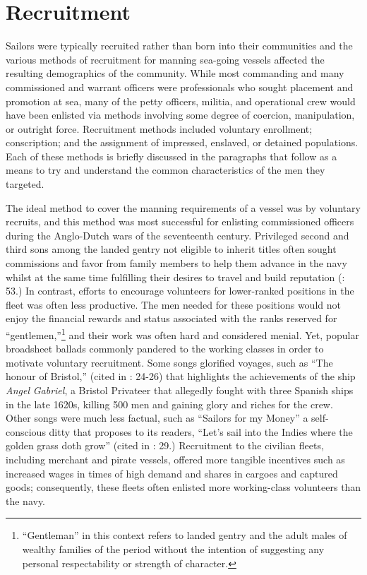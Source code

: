 \section{\textbf{Recruitment}}%

  Sailors were typically recruited rather than born into their communities and the various methods of recruitment for manning sea-going vessels affected the resulting demographics of the community. While most commanding and many commissioned and warrant officers were professionals who sought placement and promotion at sea, many of the petty officers, militia, and operational crew would have been enlisted via methods involving some degree of coercion, manipulation, or outright force. Recruitment methods included voluntary enrollment; conscription; and the assignment of impressed, enslaved, or detained populations. Each of these methods is briefly discussed in the paragraphs that follow as a means to try and understand the common characteristics of the men they targeted. 

  The ideal method to cover the manning requirements of a vessel was by voluntary recruits, and this method was most successful for enlisting commissioned officers during the Anglo-Dutch wars of the seventeenth century. Privileged second and third sons among the landed gentry not eligible to inherit titles often sought commissions and favor from family members to help them advance in the navy whilst at the same time fulfilling their desires to travel and build reputation (\citealt{Brown2011}: 53.) In contrast, efforts to encourage volunteers for lower-ranked positions in the fleet was often less productive. The men needed for these positions would not enjoy the financial rewards and status associated with the ranks reserved for “gentlemen,”\footnote{“Gentleman” in this context refers to landed gentry and the adult males of wealthy families of the period without the intention of suggesting any personal respectability or strength of character.}  and their work was often hard and considered menial. Yet, popular broadsheet ballads commonly pandered to the working classes in order to motivate voluntary recruitment. Some songs glorified voyages, such as “The honour of Bristol,” (cited in \citealt{Palmer1986}: 24-26) that highlights the achievements of the ship \textit{Angel} \textit{Gabriel}, a Bristol Privateer that allegedly fought with three Spanish ships in the late 1620s, killing 500 men and gaining glory and riches for the crew. Other songs were much less factual, such as “Sailors for my Money” a self-conscious ditty that proposes to its readers, “Let’s sail into the Indies where the golden grass doth grow” (cited in \citealt{Palmer1986}: 29.) Recruitment to the civilian fleets, including merchant and pirate vessels, offered more tangible incentives such as increased wages in times of high demand and shares in cargoes and captured goods; consequently, these fleets often enlisted more working-class volunteers than the navy. 

